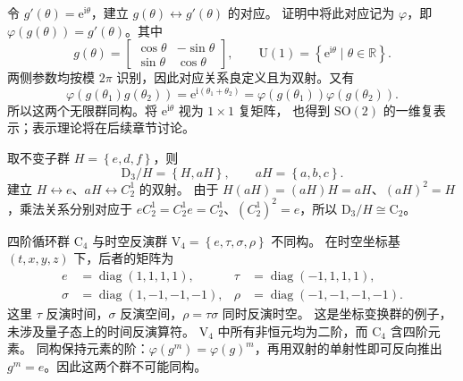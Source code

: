 \begin{example}
令 $g'\left(\theta\right)=\mathrm{e}^{\mathrm{i}\theta}$，建立 $g\left(\theta\right)\longleftrightarrow g'\left(\theta\right)$ 的对应。
证明中将此对应记为 $\varphi$，即 $\varphi\left(g\left(\theta\right)\right)=g'\left(\theta\right)$。其中
\begin{equation}
g\left(\theta\right)=\begin{bmatrix}\cos\theta&-\sin\theta\\\sin\theta&\cos\theta\end{bmatrix},
\qquad \mathrm{U}\left(1\right)=\left\{\mathrm{e}^{\mathrm{i}\theta}\mid\theta\in\mathbb{R}\right\}.
\end{equation}
两侧参数均按模 $2\pi$ 识别，因此对应关系良定义且为双射。又有
\begin{equation}
\varphi\left(g\left(\theta_1\right)g\left(\theta_2\right)\right)
=\mathrm{e}^{\mathrm{i}\left(\theta_1+\theta_2\right)}
=\varphi\left(g\left(\theta_1\right)\right)\varphi\left(g\left(\theta_2\right)\right).
\end{equation}
所以这两个无限群同构。将 $\mathrm{e}^{\mathrm{i}\theta}$ 视为 $1\times1$ 复矩阵，
也得到 $\mathrm{SO}\left(2\right)$ 的一维复表示；表示理论将在后续章节讨论。
\end{example}

\begin{example}
取不变子群 $H=\left\{e,d,f\right\}$，则
\begin{equation}
\mathrm{D}_3/H=\left\{H,aH\right\},\qquad aH=\left\{a,b,c\right\}.
\end{equation}
建立 $H\longleftrightarrow e$、$aH\longleftrightarrow C_2^1$ 的双射。
由于 $H\left(aH\right)=\left(aH\right)H=aH$、$\left(aH\right)^2=H$，乘法关系分别对应于
$eC_2^1=C_2^1e=C_2^1$、$\left(C_2^1\right)^2=e$，所以 $\mathrm{D}_3/H\cong\mathrm{C}_2$。
\end{example}

\begin{example}[同阶不保证同构]
四阶循环群 $\mathrm{C}_4$ 与时空反演群
$\mathrm{V}_4=\left\{e,\tau,\sigma,\rho\right\}$ 不同构。
在时空坐标基 $\left(t,x,y,z\right)$ 下，后者的矩阵为
\begin{align}
e&=\operatorname{diag}\left(1,1,1,1\right),&\tau&=\operatorname{diag}\left(-1,1,1,1\right),\\
\sigma&=\operatorname{diag}\left(1,-1,-1,-1\right),&\rho&=\operatorname{diag}\left(-1,-1,-1,-1\right).
\end{align}
这里 $\tau$ 反演时间，$\sigma$ 反演空间，$\rho=\tau\sigma$ 同时反演时空。
这是坐标变换群的例子，未涉及量子态上的时间反演算符。
$\mathrm{V}_4$ 中所有非恒元均为二阶，而 $\mathrm{C}_4$ 含四阶元素。
同构保持元素的阶：$\varphi\left(g^m\right)=\varphi\left(g\right)^m$，再用双射的单射性即可反向推出
$g^m=e$。因此这两个群不可能同构。
\end{example}

